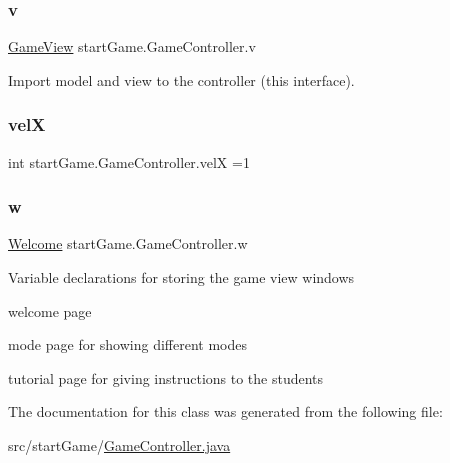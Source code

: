 \hypertarget{classstart_game_1_1_game_controller_a86e3c6ba6e8d0ecb0946da48fa55e7ee}{}\label{classstart_game_1_1_game_controller_a86e3c6ba6e8d0ecb0946da48fa55e7ee} 
\subsubsection{\texorpdfstring{v}{v}}
{\footnotesize\ttfamily \hyperlink{classview_1_1_game_view}{Game\+View} start\+Game.\+Game\+Controller.\+v\hspace{0.3cm}{\ttfamily [private]}}

Import model and view to the controller (this interface). \hypertarget{classstart_game_1_1_game_controller_a9de0dcbec624980f8b3808daa96ef457}{}\label{classstart_game_1_1_game_controller_a9de0dcbec624980f8b3808daa96ef457} 
\subsubsection{\texorpdfstring{velX}{velX}}
{\footnotesize\ttfamily int start\+Game.\+Game\+Controller.\+velX =1\hspace{0.3cm}{\ttfamily [private]}}

\hypertarget{classstart_game_1_1_game_controller_a5478c83b51a049015f9d4d6bc5c61607}{}\label{classstart_game_1_1_game_controller_a5478c83b51a049015f9d4d6bc5c61607} 
\subsubsection{\texorpdfstring{w}{w}}
{\footnotesize\ttfamily \hyperlink{classview_1_1_welcome}{Welcome} start\+Game.\+Game\+Controller.\+w\hspace{0.3cm}{\ttfamily [private]}}

Variable declarations for storing the game view windows
\begin{DoxyItemize}
\item welcome page
\item mode page for showing different modes
\item tutorial page for giving instructions to the students 
\end{DoxyItemize}

The documentation for this class was generated from the following file\+:\begin{DoxyCompactItemize}
\item 
src/start\+Game/\hyperlink{_game_controller_8java}{Game\+Controller.\+java}\end{DoxyCompactItemize}
